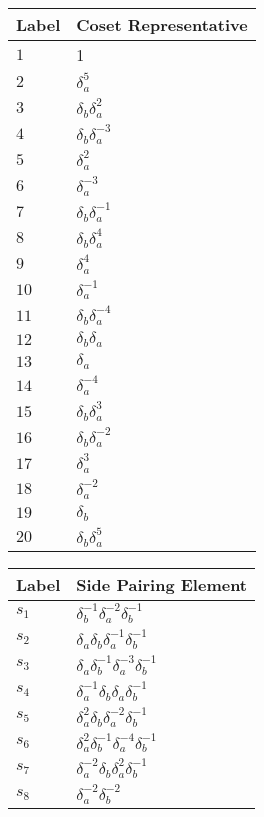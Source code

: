 \documentclass{article}
\begin{document}
\begin{center}
\begin{tabular}{ll}
\toprule
Label & Coset Representative\\
\midrule
$1$ & 1 \\
$2$ & $\delta_a^{5}$ \\
$3$ & $\delta_b^{}\delta_a^{2}$ \\
$4$ & $\delta_b^{}\delta_a^{-3}$ \\
$5$ & $\delta_a^{2}$ \\
$6$ & $\delta_a^{-3}$ \\
$7$ & $\delta_b^{}\delta_a^{-1}$ \\
$8$ & $\delta_b^{}\delta_a^{4}$ \\
$9$ & $\delta_a^{4}$ \\
$10$ & $\delta_a^{-1}$ \\
$11$ & $\delta_b^{}\delta_a^{-4}$ \\
$12$ & $\delta_b^{}\delta_a^{}$ \\
$13$ & $\delta_a^{}$ \\
$14$ & $\delta_a^{-4}$ \\
$15$ & $\delta_b^{}\delta_a^{3}$ \\
$16$ & $\delta_b^{}\delta_a^{-2}$ \\
$17$ & $\delta_a^{3}$ \\
$18$ & $\delta_a^{-2}$ \\
$19$ & $\delta_b^{}$ \\
$20$ & $\delta_b^{}\delta_a^{5}$ \\
\bottomrule
\end{tabular}
\hfill
\begin{tabular}{ll}
\toprule
Label & Side Pairing Element\\
\midrule
$s_{1}$ & $\delta_b^{-1}\delta_a^{-2}\delta_b^{-1}$ \\
$s_{2}$ & $\delta_a^{}\delta_b^{}\delta_a^{-1}\delta_b^{-1}$ \\
$s_{3}$ & $\delta_a^{}\delta_b^{-1}\delta_a^{-3}\delta_b^{-1}$ \\
$s_{4}$ & $\delta_a^{-1}\delta_b^{}\delta_a^{}\delta_b^{-1}$ \\
$s_{5}$ & $\delta_a^{2}\delta_b^{}\delta_a^{-2}\delta_b^{-1}$ \\
$s_{6}$ & $\delta_a^{2}\delta_b^{-1}\delta_a^{-4}\delta_b^{-1}$ \\
$s_{7}$ & $\delta_a^{-2}\delta_b^{}\delta_a^{2}\delta_b^{-1}$ \\
$s_{8}$ & $\delta_a^{-2}\delta_b^{-2}$ \\

\end{tabular}
\end{center}
\end{document}
